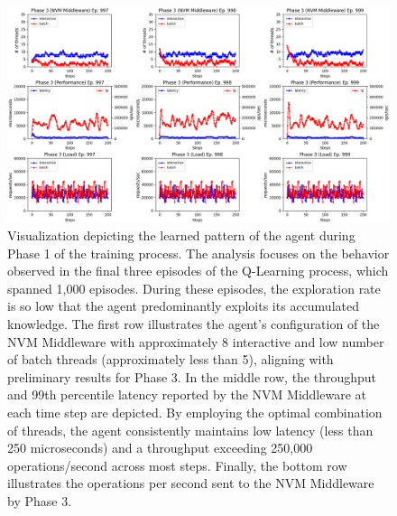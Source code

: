 \begin{figure}[H]
  \centering
  \includegraphics[width=\textwidth,height=\textheight,keepaspectratio,angle=0]{images/rl_training_phase3.png}
  \caption[Learned Pattern of Agent during Phase 3]{Visualization depicting the learned pattern of the agent during Phase 1 of the training process. The analysis focuses on the behavior observed in the final three episodes of the Q-Learning process, which spanned 1,000 episodes. During these episodes, the exploration rate is so low that the agent predominantly exploits its accumulated knowledge. The first row illustrates the agent's configuration of the NVM Middleware with approximately 8 interactive and low number of batch threads (approximately less than 5), aligning with preliminary results for Phase 3. In the middle row, the throughput and 99th percentile latency reported by the NVM Middleware at each time step are depicted. By employing the optimal combination of threads, the agent consistently maintains low latency (less than 250 microseconds) and a throughput exceeding 250,000 operations/second across most steps. Finally, the bottom row illustrates the operations per second sent to the NVM Middleware by Phase 3.}
  \label{fig:learned_phase_3}
\end{figure}

